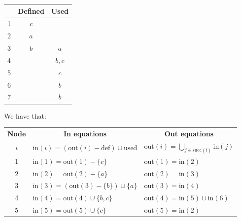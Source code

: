 \begin{enumerate}
\begin{table}[H]
\begin{tabular}{l|c|c|}
                                    & \textbf{Defined} & \textbf{Used} \\ \hline
            \multicolumn{1}{|l|}{1} & $c$              &               \\
            \multicolumn{1}{|l|}{2} & $a$              &               \\
            \multicolumn{1}{|l|}{3} & $b$              & $a$           \\
            \multicolumn{1}{|l|}{4} &                  & $b,c$         \\
            \multicolumn{1}{|l|}{5} &                  & $c$           \\
            \multicolumn{1}{|l|}{6} &                  & $b$           \\
            \multicolumn{1}{|l|}{7} &                  & $b$           \\ \hline
            \end{tabular}
        \end{table}
        We have that: 
        \begin{table}[H]
            \centering
            \begin{tabular}{|c|l|l|}
            \hline
            \textbf{Node} & \multicolumn{1}{c|}{\textbf{In equations}}                 & \multicolumn{1}{c|}{\textbf{Out equations}}                \\
            $i$           & $\text{in}(i)=(\text{out}(i)-\text{def}) \cup \text{used}$ & $\text{out}(i)=\bigcup_{j \in \text{succ}(i)}\text{in}(j)$ \\ \hline
            1             & $\text{in}(1)=\text{out}(1)-\{c\}$                         & $\text{out}(1)=\text{in}(2)$                               \\
            2             & $\text{in}(2)=\text{out}(2)-\{a\}$                         & $\text{out}(2)=\text{in}(3)$                               \\
            3             & $\text{in}(3)=(\text{out}(3)-\{b\})\cup\{a\}$              & $\text{out}(3)=\text{in}(4)$                               \\
            4             & $\text{in}(4)=\text{out}(4)\cup\{b,c\}$                    & $\text{out}(4)=\text{in}(5)\cup\text{in}(6)$               \\
            5             & $\text{in}(5)=\text{out}(5)\cup\{c\}$                      & $\text{out}(5)=\text{in}(2)$                               \\

\end{tabular}
\end{table}
\end{enumerate}
